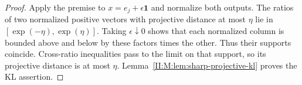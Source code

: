\begin{proof}
Apply the premise to $x=e_j+\epsilon\mathbf1$ and normalize both
outputs. The ratios of two normalized positive vectors with projective
distance at most $\eta$ lie in $[\exp(-\eta),\exp(\eta)]$.
Taking $\epsilon\downarrow0$ shows that each normalized column is
bounded above and below by these factors times the other. Thus their
supports coincide. Cross-ratio inequalities pass to the limit on that
support, so its projective distance is at most $\eta$.
Lemma~\ref{II:M:lem:sharp-projective-kl} proves the KL assertion.
\end{proof}
